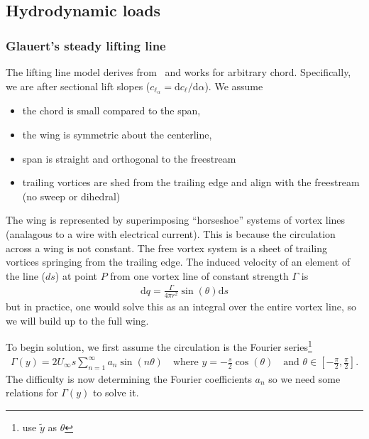 \documentclass[10pt]{article}
\newcommand{\be}{\begin{eqnarray}}
\newcommand{\ee}{\end{eqnarray}}
\newcommand{\Uinf}{U_{\infty}}
\newcommand{\tn}[1]{\textrm{#1}}
\begin{document}
\subsection{Hydrodynamic loads}
% 
\subsubsection{Glauert's steady lifting line}
% 
The lifting line model derives from~\citet[Ch. XI]{Glauert1983a} and works for arbitrary chord.
Specifically, we are after sectional lift slopes ($\textstyle c_{\ell_\alpha} = \tn{d}c_\ell/\tn{d}\alpha$).
We assume
\begin{itemize}
	\item the chord is small compared to the span,
	\item the wing is symmetric about the centerline,
	\item span is straight and orthogonal to the freestream
	\item trailing vortices are shed from the trailing edge and align with the freestream (no sweep or dihedral)
\end{itemize}

The wing is represented by superimposing ``horseshoe'' systems of vortex lines (analagous to a wire with electrical current).
This is because the circulation across a wing is not constant.
The free vortex system is a sheet of trailing vortices springing from the trailing edge.
The induced velocity of an element of the line ($ds$) at point $P$ from one vortex line of constant strength $\Gamma$ is
\be
\tn{d}q = \frac{\Gamma}{4 \pi r^2} \sin(\theta) \tn{d}s
\ee
but in practice, one would solve this as an integral over the entire vortex line, so we will build up to the full wing.

To begin solution, we first assume the circulation is the Fourier series\footnote{\citet{Kerwin2010} use $\tilde{y}$ as $\theta$}
\be
\Gamma(y) = 2 \Uinf s \sum_{n=1}^{\infty} a_n \sin \left( n \theta \right)
\quad \tn{where }
y = -\frac{s}{2}\cos(\theta)
\quad \tn{and }
\theta \in \left[-\frac{\pi}{2},\frac{\pi}{2}\right]
.
\ee
The difficulty is now determining the Fourier coefficients $a_n$ so we need some relations for $\Gamma(y)$ to solve it.
\end{document}
